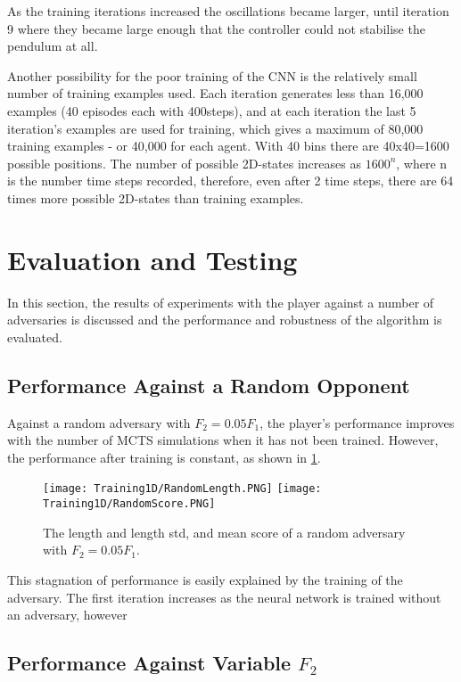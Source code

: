 \documentclass[../main.tex]{subfiles}
\begin{document}
As the training iterations increased the oscillations became larger, until iteration 9 where they became large enough that the controller could not stabilise the pendulum at all.

Another possibility for the poor training of the CNN is the relatively small number of training examples used. Each iteration generates less than 16,000 examples (40 episodes each with 400steps), and at each iteration the last 5 iteration's examples are used for training, which gives a maximum of 80,000 training examples - or 40,000 for each agent. With 40 bins there are 40x40=1600 possible positions. The number of possible 2D-states increases as $1600^n$, where n is the number time steps recorded, therefore, even after 2 time steps, there are 64 times more possible 2D-states than training examples.

\newpage
\section{Evaluation and Testing}

In this section, the results of experiments with the player against a number of adversaries is discussed and the performance and robustness of the algorithm is evaluated.

\subsection{Performance Against a Random Opponent}

Against a random adversary with $F_2 = 0.05F_1$, the player's performance improves with the number of MCTS simulations when it has not been trained. However, the performance after training is constant, as shown in \cref{fig:rand}.

\begin{figure}[H]
    \centering
    \texttt{[image: Training1D/RandomLength.PNG]}
    \texttt{[image: Training1D/RandomScore.PNG]}
    \caption{The length and length std, and mean score of a random adversary with $F_2=0.05F_1$.}
    \label{fig:rand}
\end{figure}

This stagnation of performance is easily explained by the training of the adversary. The first iteration increases as the neural network is trained without an adversary, however

\subsection{Performance Against Variable $F_2$}
\end{document}
